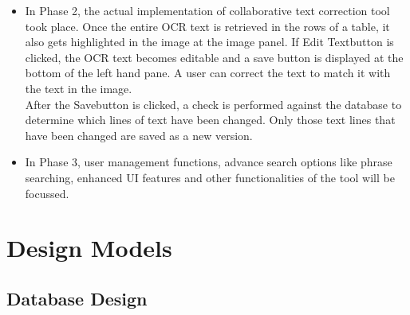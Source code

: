 \documentclass[12pt]{article}
\begin{document}
\begin{itemize}
\item In Phase 2, the actual implementation of collaborative text correction tool took place. Once the entire OCR text is retrieved in the rows of a table, it also gets highlighted in the image at the image panel. If \textgravedbl Edit Text\textasciidieresis button is clicked, the OCR text becomes editable and a save button is displayed at the bottom of the left hand pane. A user can correct the text to match it with the text in the image. \\
After the \textgravedbl Save\textasciidieresis button is clicked, a check is performed against the database to determine which lines of text have been changed.  Only those text lines that have been changed are saved as a new version.
\item In Phase 3, user management functions, advance search options like phrase searching, enhanced UI features and other functionalities of the tool will be focussed.
\end{itemize}

\section{Design Models}
\label{sec:models}
\subsection{Database Design}

\end{document}
